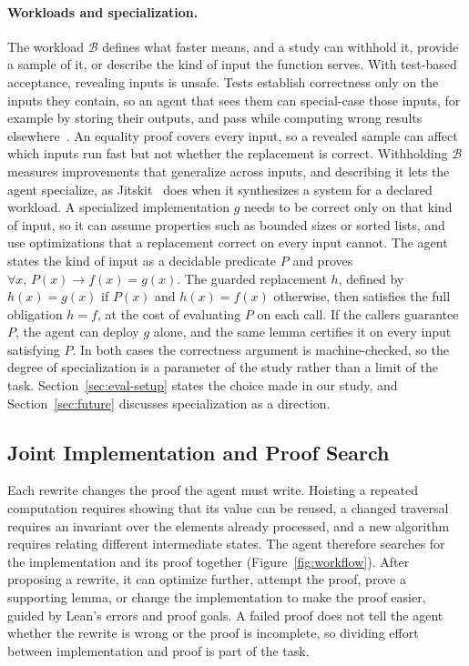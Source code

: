 \documentclass{article}
\begin{document}
\paragraph{Workloads and specialization.}
The workload $\mathcal{B}$ defines what faster means, and a study can withhold it, provide a sample of it, or describe the kind of input the function serves.
With test-based acceptance, revealing inputs is unsafe.
Tests establish correctness only on the inputs they contain, so an agent that sees them can special-case those inputs, for example by storing their outputs, and pass while computing wrong results elsewhere~\citep{liu2026time,zhang2026kernelbench}.
An equality proof covers every input, so a revealed sample can affect which inputs run fast but not whether the replacement is correct.
Withholding $\mathcal{B}$ measures improvements that generalize across inputs, and describing it lets the agent specialize, as Jitskit~\citep{liu2026time} does when it synthesizes a system for a declared workload.
A specialized implementation $g$ needs to be correct only on that kind of input, so it can assume properties such as bounded sizes or sorted lists, and use optimizations that a replacement correct on every input cannot.
The agent states the kind of input as a decidable predicate $P$ and proves $\forall x,\, P(x) \rightarrow f(x) = g(x)$.
The guarded replacement $h$, defined by $h(x) = g(x)$ if $P(x)$ and $h(x) = f(x)$ otherwise, then satisfies the full obligation $h = f$, at the cost of evaluating $P$ on each call.
If the callers guarantee $P$, the agent can deploy $g$ alone, and the same lemma certifies it on every input satisfying $P$.
In both cases the correctness argument is machine-checked, so the degree of specialization is a parameter of the study rather than a limit of the task.
Section~\ref{sec:eval-setup} states the choice made in our study, and Section~\ref{sec:future} discusses specialization as a direction.

\subsection{Joint Implementation and Proof Search}
\label{sec:design}
\label{sec:pipeline}

Each rewrite changes the proof the agent must write.
Hoisting a repeated computation requires showing that its value can be reused, a changed traversal requires an invariant over the elements already processed, and a new algorithm requires relating different intermediate states.
The agent therefore searches for the implementation and its proof together (Figure~\ref{fig:workflow}).
After proposing a rewrite, it can optimize further, attempt the proof, prove a supporting lemma, or change the implementation to make the proof easier, guided by Lean's errors and proof goals.
A failed proof does not tell the agent whether the rewrite is wrong or the proof is incomplete, so dividing effort between implementation and proof is part of the task.
\end{document}
